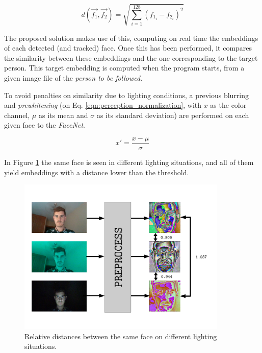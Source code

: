 \begin{equation}
d(\vec{f_1}, \vec{f_2}) = \sqrt{\sum_{i=1}^{128}(f_{1_i} - f_{2_i})^2}
\label{eqn:eucl_distance}
\end{equation}

The proposed solution makes use of this, computing on real time the embeddings of each detected (and tracked) face. Once this has been performed, it compares the similarity between these embeddings and the one corresponding to the target person. This target embedding is computed when the program starts, from a given image file of the \emph{person to be followed}.

To avoid penalties on similarity due to lighting conditions, a previous blurring and \emph{prewhitening} (on Eq. \ref{eqn:perception_normalization}, with $x$ as the color channel, $\mu$ as its mean and $\sigma$ as its standard deviation) are performed on each given face to the \emph{FaceNet}.

\begin{equation}
x' = \frac{x - \mu}{\sigma}
\label{eqn:perception_normalization}
\end{equation}

In Figure \ref{fig:perception_distance} the same face is seen in different lighting situations, and all of them yield embeddings with a distance lower than the threshold.

\begin{figure}[h]
	\centering
	\includegraphics[width=10cm]{images/facenet_prewhiten}
	\caption{Relative distances between the same face on different lighting situations.}
        \label{fig:perception_distance}
\end{figure}





